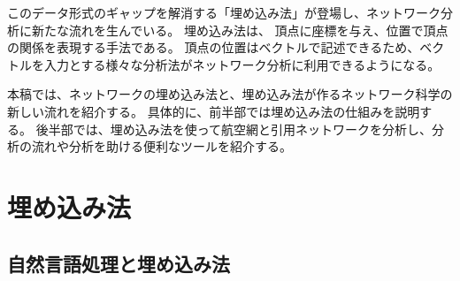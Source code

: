 \documentclass[J]{scitrans}
\begin{document}
%

%

このデータ形式のギャップを解消する「埋め込み法」が登場し、ネットワーク分析に新たな流れを生んでいる。
埋め込み法は、 頂点に座標を与え、位置で頂点の関係を表現する手法である。
頂点の位置はベクトルで記述できるため、ベクトルを入力とする様々な分析法がネットワーク分析に利用できるようになる。

本稿では、ネットワークの埋め込み法と、埋め込み法が作るネットワーク科学の新しい流れを紹介する。
具体的に、前半部では埋め込み法の仕組みを説明する。
後半部では、埋め込み法を使って航空網と引用ネットワークを分析し、分析の流れや分析を助ける便利なツールを紹介する。

\section{埋め込み法}

\subsection{自然言語処理と埋め込み法}
\end{document}
